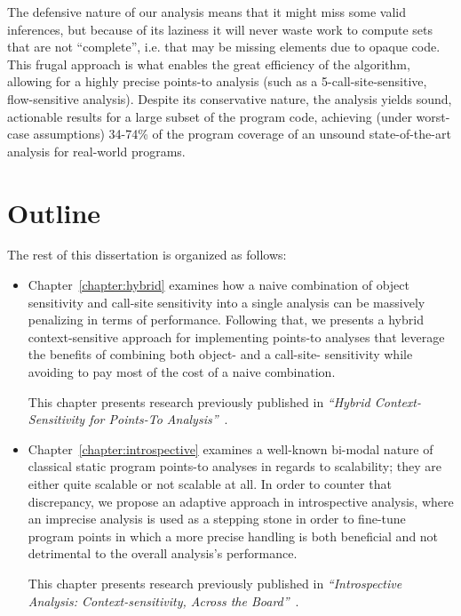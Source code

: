 The defensive nature of our analysis means that it might miss some valid inferences, but because of its laziness it will never waste work to compute sets that are not ``complete'', i.e. that may be missing elements due to opaque code. This frugal approach is what enables the great efficiency of the algorithm, allowing for a highly precise points-to analysis (such as a 5-call-site-sensitive, flow-sensitive analysis). Despite its conservative nature, the analysis yields sound, actionable results for a large subset of the program code, achieving (under worst-case assumptions) 34-74\% of the program coverage of an unsound state-of-the-art analysis for real-world programs.


\section{Outline}

The rest of this dissertation is organized as follows:
\begin{itemize}[$\bullet$]
\item Chapter~\ref{chapter:hybrid} examines how a naive combination of object sensitivity and call-site sensitivity into a single analysis can be massively penalizing in terms of performance. Following that, we presents a hybrid context-sensitive approach for implementing points-to analyses that leverage the benefits of combining both object- and a call-site- sensitivity while avoiding to pay most of the cost of a naive combination.

This chapter presents research previously published in \emph{``Hybrid Context-Sensitivity for Points-To Analysis''}~\cite{pldi:2013:Kastrinis}.

\item Chapter~\ref{chapter:introspective} examines a well-known bi-modal nature of classical static program points-to analyses in regards to scalability; they are either quite scalable or not scalable at all. In order to counter that discrepancy, we propose an adaptive approach in introspective analysis, where an imprecise analysis is used as a stepping stone in order to fine-tune program points in which a more precise handling is both beneficial and not detrimental to the overall analysis's performance.

This chapter presents research previously published in \emph{``Introspective Analysis: Context-sensitivity, Across the Board''}~\cite{pldi:2014:Smaragdakis}.
\end{itemize}

